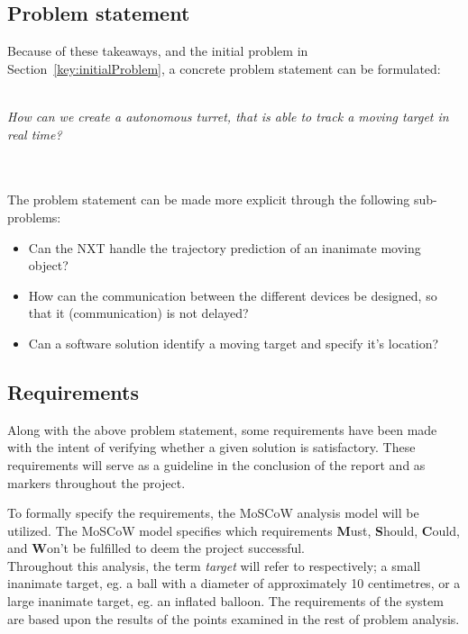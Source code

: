 \subsection{Problem statement}
Because of these takeaways, and the initial problem in Section~\ref{key:initialProblem}, a concrete problem statement can be formulated:\\~\\
\begin{center}
	
	\textit{\large{How can we create a autonomous turret, that is able to track a moving target in real time?}}
\end{center}~\\~\\

The problem statement can be made more explicit through the following sub-problems:
\begin{center}
	\begin{itemize}
		\item Can the NXT handle the trajectory prediction of an inanimate moving object?
		\item How can the communication between the different devices be designed, so that it (communication) is not delayed? 
		\item Can a software solution identify a moving target and specify it's location?
	\end{itemize}
\end{center}


\subsection{Requirements}
Along with the above problem statement, some requirements have been made with the intent of verifying whether a given solution is satisfactory.
These requirements will serve as a guideline in the conclusion of the report and as markers throughout the project. 

To formally specify the requirements, the MoSCoW analysis model will be utilized. 
The MoSCoW model specifies which requirements \textbf{M}ust, \textbf{S}hould, \textbf{C}ould, and \textbf{W}on't be fulfilled to deem the project successful.\\

Throughout this analysis, the term \textit{target} will refer to respectively; a small inanimate target, eg{.} a ball with a diameter of approximately 10 centimetres, or a large inanimate target, eg{.} an inflated balloon.
The requirements of the system are based upon the results of the points examined in the rest of problem analysis.

